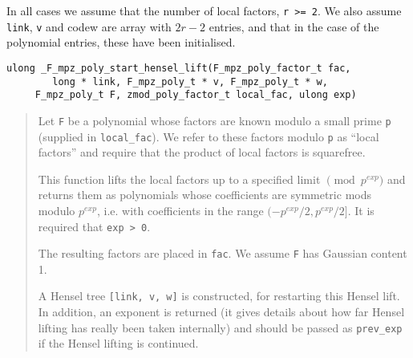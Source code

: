 \documentclass[a4paper,10pt]{article}
\newcommand{\code}{\lstinline}
\begin{document}
In all cases we assume that the number of local factors, \code{r >= 2}. We also assume \code{link}, 
\code{v} and code{w} are array with $2r - 2$ entries, and that in the case of the polynomial entries,
these have been initialised.

\begin{lstlisting}
ulong _F_mpz_poly_start_hensel_lift(F_mpz_poly_factor_t fac, 
        long * link, F_mpz_poly_t * v, F_mpz_poly_t * w, 
     F_mpz_poly_t F, zmod_poly_factor_t local_fac, ulong exp)
\end{lstlisting}
\begin{quote}
Let \code{F} be a polynomial whose factors are known modulo a small prime \code{p} (supplied in 
\code{local_fac}). We refer to these factors modulo \code{p} as ``local factors'' and require that the 
product of local factors is squarefree. 

This function lifts the local factors up to a specified limit $\pmod{p^{exp}}$ and returns them as 
polynomials whose coefficients are symmetric mods modulo $p^{exp}$, i.e. with coefficients in the range 
$(-p^{exp}/2, p^{exp}/2]$. It is required that \code{exp > 0}.

The resulting factors are placed in \code{fac}. We assume \code{F} has Gaussian content 1.

A Hensel tree \code{[link, v, w]} is constructed, for restarting this Hensel lift. In addition, an
exponent is returned (it gives details about how far Hensel lifting has really been taken internally)
and should be passed as \code{prev_exp} if the Hensel lifting is continued.
\end{quote}
\end{document}
